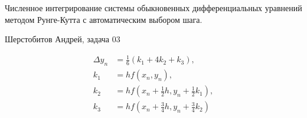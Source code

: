 \documentclass[12pt]{article}
\begin{document}
\begin{center}
	Численное интегрирование системы обыкновенных дифференциальных уравнений
	методом Рунге-Кутта с автоматическим выбором шага.
\end{center}
\begin{center}
	Шерстобитов Андрей, задача 03
\end{center}

\begin{align*}
	\Delta y_n & =\frac{1}{6}(k_1+4k_2+k_3),                \\
	k_1        & = hf(x_n, y_n),                            \\
	k_2        & = hf(x_n+\frac{1}{2}h,y_n+\frac{1}{2}k_1), \\
	k_3        & = hf(x_n+\frac{3}{4}h,y_n+\frac{3}{4}k_2)
\end{align*}
\end{document}
